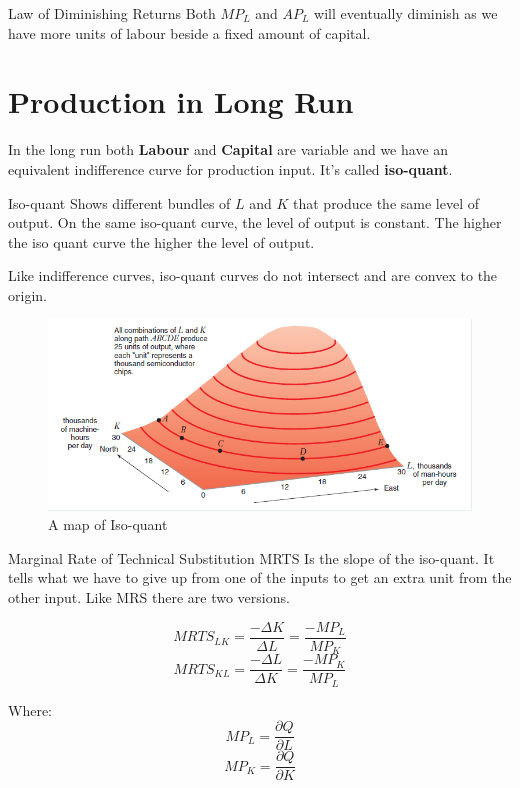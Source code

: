 \documentclass[../ECON-281-Notes.tex]{subfiles}
\begin{document}
\begin{Theorem}
    {Law of Diminishing Returns}
    Both \(MP_L\) and \(AP_L\) will eventually diminish as we have more units of labour beside a fixed amount of capital. 
\end{Theorem}

\section{Production in Long Run}
In the long run both \textbf{Labour} and \textbf{Capital} are variable and we have an equivalent indifference curve for production input. It's called \textbf{iso-quant}.

\begin{Definition}
    {Iso-quant}
    Shows different bundles of \(L\) and \(K\) that produce the same level of output.
    On the same iso-quant curve, the level of output is constant. The higher the iso quant curve the higher the level of output.

    Like indifference curves, iso-quant curves do not intersect and are convex to the origin. 
\end{Definition}
\begin{figure}[!h]
    \centering
    \includegraphics[width=\columnwidth]{../assets/isoquant.png}
    \caption{A map of Iso-quant}
    \label{fig:isoquant}
\end{figure}

\begin{Definition}
    {Marginal Rate of Technical Substitution MRTS}
    Is the slope of the iso-quant. It tells what we have to give up from one of the inputs to get an extra unit from the other input. Like MRS there are two versions. 

    \begin{equation}
        MRTS_{LK} = \frac{-\Delta K}{\Delta L} = \frac{-MP_L}{MP_K}
    \end{equation}
    \begin{equation}
        MRTS_{KL} = \frac{-\Delta L}{\Delta K} = \frac{-MP_K}{MP_L}
    \end{equation}
    
    Where:
    \begin{equation}
        MP_L = \frac{\partial Q}{\partial L}   
    \end{equation}
    \begin{equation}
        MP_K = \frac{\partial Q}{\partial K}
    \end{equation}
\end{Definition}
\end{document}
